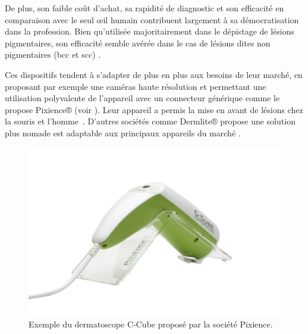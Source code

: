 De plus, son faible coût d’achat, sa rapidité de diagnostic et son efficacité en comparaison avec le seul œil humain \cite{Lallas2013} contribuent largement à sa démocratisation dans la profession. Bien qu’utilisée majoritairement dans le dépistage de lésions pigmentaires, son efficacité semble avérée dans le cas de lésions dites non pigmentaires (\gls{bcc} et \gls{scc}) \cite{Lallas2013}. 

Ces dispositifs tendent à s'adapter de plus en plus aux besoins de leur marché, en proposant par exemple une caméras haute résolution et permettant une utilisation polyvalente de l'appareil avec un connecteur générique comme le propose Pixience® (voir ). Leur appareil a permis la mise en avant de lésions chez la souris et l'homme~\cite{Cinotti2016,Pillon2017}. D'autres sociétés comme Dermlite® propose une solution plus nomade est adaptable aux principaux appareils du marché .\par

\begin{figure}[H]
    \centering
    \includegraphics[width=0.60\linewidth]{contents/chapter_2/resources/example_device_ccube.jpg}
    \caption{Exemple du dermatoscope C-Cube proposé par la société Pixience.}
    \label{fig:example_device_ccube}
\end{figure}\par

